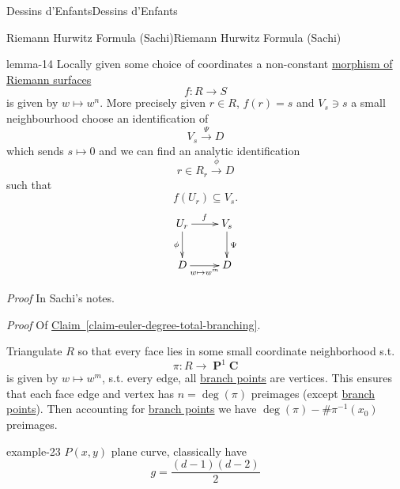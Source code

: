\documentclass[10pt,]{book}
\makeatletter
\renewcommand*{\proofname}{Proof}
\renewenvironment{proof}[1][\proofname]{\par
  \pushQED{\qed}%
  \normalfont \topsep6\p@\@plus6\p@\relax
  \trivlist
  \item\relax
    {\itshape
    #1\@addpunct{.}}\hspace\labelsep\ignorespaces
}{%
  \popQED\endtrivlist\@endpefalse
}
\numberwithin{equation}{section}
\newcommand{\inv}{^{-1}}
\newcommand{\CC}{\mathbf{C}}
\DeclareMathOperator{\PP}{\mathbf{P}}
\makeatother
\begin{document}
\begin{chapterptx}{Dessins d'Enfants}{}{Dessins d'Enfants}{}{}
\begin{sectionptx}{Riemann Hurwitz Formula (Sachi)}{}{Riemann Hurwitz Formula (Sachi)}{}{}
\begin{lemma}{}{}{lemma-14}%
\hypertarget{p-516}{}%
Locally given some choice of coordinates a non-constant \hyperref[def-morph-riem-surf]{morphism of Riemann surfaces}%
\begin{equation*}
f\colon R \to S
\end{equation*}
is given by \(w\mapsto w^n\). More precisely given \(r \in R\), \(f(r) = s\) and \(V_s \ni s\) a small neighbourhood choose an identification of%
\begin{equation*}
V_s \xrightarrow \Psi D
\end{equation*}
which sends \(s \mapsto 0\) and we can find an analytic identification%
\begin{equation*}
r\in R_r \xrightarrow \phi D
\end{equation*}
such that%
\begin{equation*}
f(U_r) \subseteq V_s\text{.}
\end{equation*}
%
\begin{equation*}
\xymatrix{U_r \ar[r]^f \ar[d]_\phi & V_s \ar[d]^\Psi \\ D \ar[r]_{w\mapsto w^m} & D}
\end{equation*}
%
\end{lemma}
\begin{proof}\hypertarget{proof-83}{}
\hypertarget{p-517}{}%
In Sachi's notes.%
\end{proof}
\begin{proof}\hypertarget{proof-84}{}
\hypertarget{p-518}{}%
Of \hyperref[claim-euler-degree-total-branching]{Claim~\ref{claim-euler-degree-total-branching}}.%
\par
\hypertarget{p-519}{}%
Triangulate \(R\) so that every face lies in some small coordinate neighborhood s.t.%
\begin{equation*}
\pi \colon R\to \PP^1 \CC
\end{equation*}
is given by \(w \mapsto w^m\), s.t. every edge, all \hyperref[def-branch-point]{branch points} are vertices. This ensures that each face edge and vertex has \(n  = \deg (\pi)\) preimages (except \hyperref[def-branch-point]{branch points}). Then accounting for \hyperref[def-branch-point]{branch points} we have \(\deg(\pi) -  \# \pi\inv (x_0)\) preimages.%
\end{proof}
\begin{example}{}{example-23}%
\hypertarget{p-520}{}%
\(P(x,y)\) plane curve, classically have%
\begin{equation*}
g = \frac{(d-1)(d-2)}{2}
\end{equation*}

\end{example}
\end{sectionptx}
\end{chapterptx}
\end{document}
